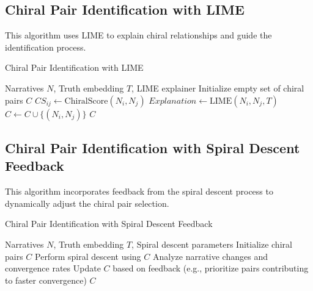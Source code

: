 \documentclass{article}
\begin{document}
\subsection{Chiral Pair Identification with LIME}

This algorithm uses LIME to explain chiral relationships and guide the identification process.

\begin{algorithm}[H]
\caption{Chiral Pair Identification with LIME}
\begin{algorithmic}[1]
\Require Narratives $N$, Truth embedding $T$, LIME explainer
\State Initialize empty set of chiral pairs $C$
    \State $CS_{ij} \gets \text{ChiralScore}(N_i, N_j)$
        \State $Explanation \gets \text{LIME}(N_i, N_j, T)$
            \State $C \gets C \cup \{(N_i, N_j)\}$
        \EndIf
    \EndIf
\EndFor
\Return $C$
\end{algorithmic}
\end{algorithm}


\subsection{Chiral Pair Identification with Spiral Descent Feedback}

This algorithm incorporates feedback from the spiral descent process to dynamically adjust the chiral pair selection.

\begin{algorithm}[H]
\caption{Chiral Pair Identification with Spiral Descent Feedback}
\begin{algorithmic}[1]
\Require Narratives $N$, Truth embedding $T$, Spiral descent parameters
\State Initialize chiral pairs $C$
\Repeat
    \State Perform spiral descent using $C$
    \State Analyze narrative changes and convergence rates
    \State Update $C$ based on feedback (e.g., prioritize pairs contributing to faster convergence)
\Return $C$
\end{algorithmic}
\end{algorithm}
\end{document}
